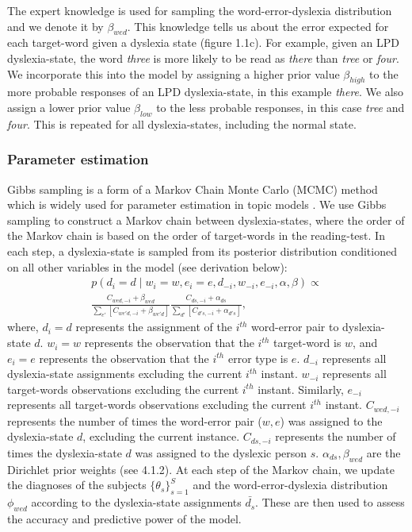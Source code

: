 The expert knowledge is used for sampling the word-error-dyslexia distribution and we denote it by $ \beta_{wed} $. This knowledge tells us about the error expected for each target-word given a dyslexia state (figure 1.1c). For example, given an LPD dyslexia-state, the word {\it three} is more likely to be read as {\it there} than {\it tree} or {\it four}. We incorporate this into the model by assigning a higher prior value $ \beta_{high} $ to the more probable responses of an LPD dyslexia-state, in this example {\it there}. We also assign a lower prior value $ \beta_{low} $ to the less probable responses, in this case {\it tree} and {\it four}. This is repeated for all dyslexia-states, including the normal state.

\vfill

\subsubsection{Parameter estimation}
Gibbs sampling is a form of a Markov Chain Monte Carlo (MCMC) method which is widely used for parameter estimation in topic models \citep{gs04, rgss04}. We use Gibbs sampling to construct a Markov chain between dyslexia-states, where the order of the Markov chain is based on the order of target-words in the reading-test. In each step, a dyslexia-state is sampled from its posterior distribution conditioned on all other variables in the model (see derivation below): 
\begin{equation}
\begin{split}
p(d_i = d\mid w_i = w, e_i = e, d_{-i}, w_{-i}, e_{-i}, \alpha, \beta) \propto \\
\frac{ C_{wed, -i} + \beta_{wed} } {\sum_{e'} [C_{we'd, -i} + \beta_{we'd}] } \frac{ C_{ds, -i} + \alpha_{ds} } {{\sum_{d'}[ C_{d's, -i} + \alpha_{d's}] }},
\end{split}
\end{equation}
where, $ d_i=d $ represents the assignment of the $ i^{th} $ word-error pair to dyslexia-state $d$. $ w_i = w $ represents the observation that the $i^{th}$ target-word is $w$, and $e_i = e $ represents the observation that the $i^{th}$ error type is $e$. $ d_{-i} $ represents all dyslexia-state assignments excluding the current $i^{th}$ instant. $ w_{-i} $ represents all target-words observations excluding the current $i^{th}$ instant. Similarly, $ e_{-i} $ represents all target-words observations excluding the current $i^{th}$ instant.
$ C_{wed, -i} $ represents the number of times the word-error pair ($w, e$) was assigned to the dyslexia-state $d$, excluding the current instance. $ C_{ds, -i} $ represents the number of times the dyslexia-state $d$ was assigned to the dyslexic person $s$. $ \alpha_{ds} , \beta_{wed} $ are the Dirichlet prior weights (see 4.1.2).
At each step of the Markov chain, we update the diagnoses of the subjects $ { \{ \theta_{s} \} }_{s=1}^S $ and the word-error-dyslexia distribution $ \phi_{wed} $ according to the dyslexia-state assignments $ \bar{d_{s}} $. These are then used to assess the accuracy and predictive power of the model.

